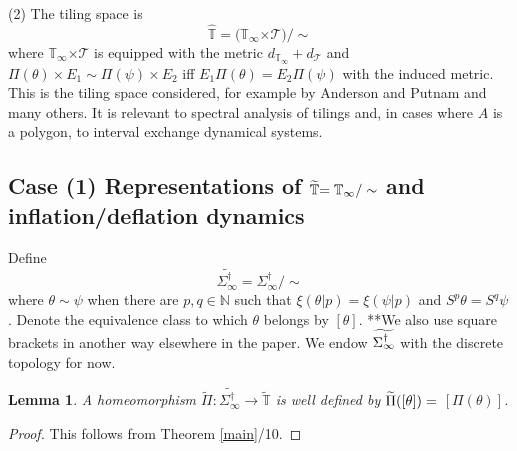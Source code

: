 \documentclass{amsproc}
\theoremstyle{plain}
\newtheorem{lemma}{Lemma}
\theoremstyle{definition}
\numberwithin{equation}{section}
\begin{document}
(2) The tiling space is 
\begin{equation*}
\widehat{\mathbb{T}}=(\mathbb{T}_{\infty}\mathbb{\times}\mathcal{T)}/\sim
\end{equation*}
where $\mathbb{T}_{\infty}\mathbb{\times}\mathcal{T}$ is equipped with the
metric $d_{\mathbb{T}_{\infty}}+d_{\mathcal{T}}$ and $\Pi(\theta)\times
E_{1}\sim\Pi(\psi)\times E_{2}$ iff $E_{1}\Pi(\theta)=E_{2}\Pi(\psi)$ with
the induced metric. This is the tiling space considered, for example by
Anderson and Putnam and many others. It is relevant to spectral analysis of
tilings and, in cases where $A$ is a polygon, to interval exchange dynamical
systems.

\subsection{Case (1) Representations of $\protect\widetilde{\mathbb{T}}%
\mathbb{=T}_{\infty}/\sim$ and inflation/deflation dynamics}

Define 
\begin{equation*}
\widetilde{\Sigma_{\infty}^{\dag}}=\Sigma_{\infty}^{\dag}/\sim
\end{equation*}
where $\theta\sim\psi$ when there are $p,q\in\mathbb{N}$ such that $\xi
(\theta|p)=\xi(\psi|p)$ and $S^{p}\theta=S^{q}\psi$. Denote the equivalence
class to which $\theta$ belongs by $\left[ \theta\right] $. **We also use
square brackets in another way elsewhere in the paper. We endow $\widetilde{%
\Sigma_{\infty}^{\dag}}$ with the discrete topology for now.

\begin{lemma}
\label{prevlem}A homeomorphism $\widetilde{\Pi}:\widetilde{\Sigma_{\infty
}^{\dag}}\rightarrow\widetilde{\mathbb{T}}$ is well defined by $\widetilde{%
\Pi }(\left[ \theta\right] )=$ $\left[ \Pi(\theta)\right] $.
\end{lemma}

\begin{proof}
This follows from Theorem \ref{main}/10.
\end{proof}
\end{document}
